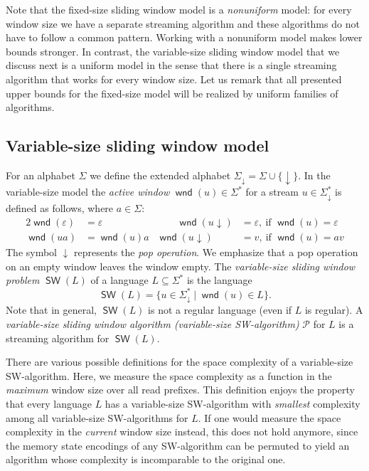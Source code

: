 \documentclass{article}\usepackage[a4paper,margin=20mm]{geometry}
\renewcommand{\P}{\mathcal{P}}
\DeclareMathOperator{\wnd}{\mathsf{wnd}}
\DeclareMathOperator{\SW}{\mathsf{SW}}
\begin{document}
Note that the fixed-size sliding window model is a {\em nonuniform} model: for every window size we have
a separate streaming algorithm and these algorithms do not have to follow a common pattern. 
Working with a nonuniform model makes lower bounds stronger.
In contrast, the variable-size sliding window model that we discuss next is a uniform model in the 
sense that there is a single streaming algorithm that works for every window size.
Let us remark that all presented upper bounds for the fixed-size model will be realized by uniform families of algorithms.


\subsection{Variable-size sliding window model} \label{sec-variable-size}

For an alphabet $\Sigma$ we define the extended alphabet $\Sigma_\downarrow = \Sigma \cup \{\downarrow\}$.
In the variable-size model the {\em active window} $\wnd(u) \in \Sigma^*$ for a stream $u \in \Sigma_\downarrow^*$ is defined as follows, where $a \in \Sigma$:
\begin{alignat*}{2}
\wnd(\varepsilon) & = \varepsilon  & \qquad     \wnd(u \! \downarrow) & = \varepsilon, ~ \text{if } \wnd(u) = \varepsilon \\
\wnd(ua) & = \wnd(u) a         &   \wnd(u \! \downarrow) & = v, ~ \text{if } \wnd(u) = av
\end{alignat*}
The symbol $\downarrow$ represents the {\em pop operation}.
We emphasize that a pop operation on an empty window leaves the window empty.
The {\em variable-size sliding window problem} $\SW(L)$ of
a language $L \subseteq \Sigma^*$ is the language
\begin{equation}
\label{def-SW(L)}
\SW(L) = \{ u \in \Sigma_\downarrow^* \mid \wnd(u) \in L \}.
\end{equation}
Note that in general, $\SW(L)$ is not a regular language (even if $L$ is regular).
A {\em variable-size sliding window algorithm (variable-size SW-algorithm)} $\P$ for $L$
is a streaming algorithm for $\SW(L)$.

There are various possible definitions for the space complexity of a variable-size SW-algorithm.
Here, we measure the space complexity as a function in the \emph{maximum} window size over all read prefixes.
This definition enjoys the property that every language $L$ has a variable-size SW-algorithm with \emph{smallest} complexity
among all variable-size SW-algorithms for $L$.
If one would measure the space complexity in the \emph{current} window size instead,
this does not hold anymore, since the memory state encodings of any SW-algorithm can be permuted
to yield an algorithm whose complexity is incomparable to the original one.
\end{document}
